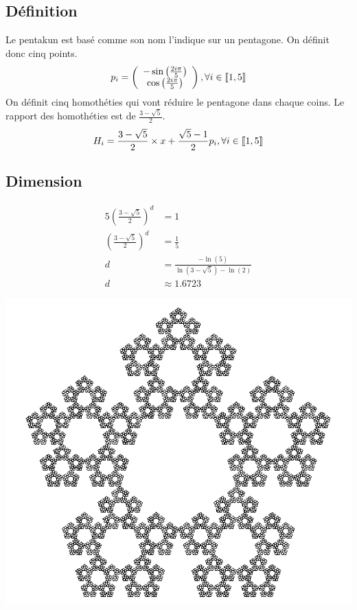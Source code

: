 \documentclass[a4paper, 12pt]{report}
\begin{document}
			\subsection{Définition}
				Le pentakun est basé comme son nom l'indique sur un pentagone. On définit donc cinq points.
				\begin{equation*}
					p_i=\left(\begin{array}{ccc}
							-\sin\left(\frac{2i\pi}{5}\right)\\
							\cos\left(\frac{2i\pi}{5}\right)\\
						\end{array}\right)
						,\forall i\in\textrm{\textlbrackdbl} 1,5\textrm{\textrbrackdbl}
			\end{equation*}
				On définit cinq homothéties qui vont réduire le pentagone dans chaque coins. Le rapport des homothéties est de $\frac{3-\sqrt{5}}{2}$.
				\begin{equation*}
					H_i=\frac{3-\sqrt{5}}{2}\times x+\frac{\sqrt{5}-1}{2}p_i,\forall i\in\textrm{\textlbrackdbl} 1,5\textrm{\textrbrackdbl}
				\end{equation*}
			\subsection{Dimension}
				\begin{align*}
					 5\left(\frac{3-\sqrt{5}}{2}\right)^d	&=1\\
					 \left(\frac{3-\sqrt{5}}{2}\right)^d	&=\frac{1}{5}\\
														d	&=\frac{-\ln(5)}{\ln(3-\sqrt{5})-\ln(2)}\\
														d	&\approx 1.6723
				\end{align*}
				\begin{center}
					\includegraphics[scale=0.5]{Images/pentakun.png}
				\end{center}
				
\end{document}
